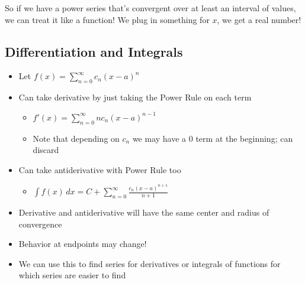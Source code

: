 \documentclass[letterpaper, 11pt, openany]{book}
\theoremstyle{mytheoremstyle}
\theoremstyle{myexamplestyle}
\begin{document}
So if we have a power series that's convergent over at least an interval of values, we can treat it like a function! We plug in something for \(x\), we get a real number! \faThumbsUp

\subsection{Differentiation and Integrals}
\begin{itemize}
    \item Let $\displaystyle f(x) = \sum_{n = 0}^{\infty} c_{n} \left( x  - a \right)^{n}$
    \item Can take derivative by just taking the Power Rule on each term
    \begin{itemize}
        \item $\displaystyle f'(x) = \sum_{n = 0}^{\infty} n c_{n} \left( x  - a \right)^{n-1}$
        \item Note that depending on $c_{n}$ we may have a 0 term at the beginning; can discard
    \end{itemize}
    \item Can take antiderivative with Power Rule too
    \begin{itemize}
        \item $\displaystyle \int \! f(x) \, dx = C + \sum_{n = 0}^{\infty} \frac{c_{n} \left( x  - a \right)^{n+1}}{n+1}$
    \end{itemize}
    \item Derivative and antiderivative will have the same center and radius of convergence
    \item[{\faExclamationCircle[solid]}] Behavior at endpoints may change!
    \item We can use this to find series for derivatives or integrals of functions for which series are easier to find \faThumbsUp 
\end{itemize}
\end{document}

